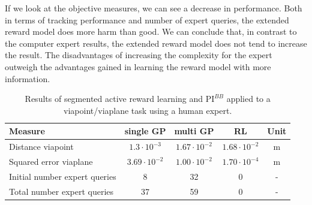\documentclass[mscThesis.tex]{subfiles}
\begin{document}
If we look at the objective measures, we can see a decrease in performance. Both in terms of tracking performance and number of expert queries, the extended reward model does more harm than good. We can conclude that, in contrast to the computer expert results, the extended reward model does not tend to increase the result. The disadvantages of increasing the complexity for the expert outweigh the advantages gained in learning the reward model with more information.

\begin{table}[!htb]
    \centering
    \caption{Results of segmented active reward learning and $\text{PI}^{BB}$ applied to a viapoint/viaplane task using a human expert.}
    \label{tab:ad-var-hum}
    \begin{tabular}{|p{6cm}|c|c|c|c|}
        \hline
        Measure & single GP & multi GP & RL & Unit \\ \hline \hline
        Distance viapoint & $1.3 \cdot 10^{-3}$ & $1.67 \cdot 10^{-2}$ & $1.68 \cdot 10^{-2}$ & \si{m}  \\ \hline
        Squared error viaplane & $3.69 \cdot 10^{-2}$ & $1.00 \cdot 10^{-2}$ &  $1.70 \cdot 10^{-4}$ & \si{m}  \\ \hline
        Initial number expert queries & 8 & 32 & 0 & - \\ \hline
        Total number expert queries & 37 & 59 & 0 &  - \\ \hline
    \end{tabular}
\end{table}


% 
\end{document}
